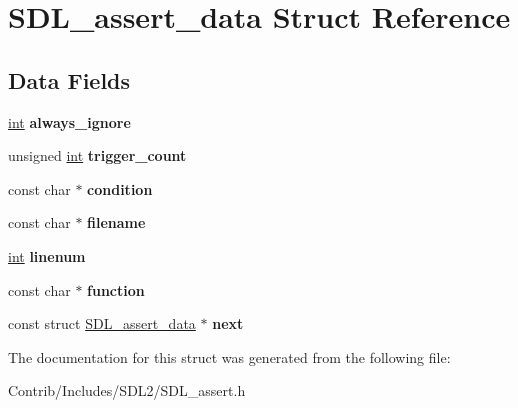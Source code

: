 \hypertarget{struct_s_d_l__assert__data}{}\section{S\+D\+L\+\_\+assert\+\_\+data Struct Reference}
\label{struct_s_d_l__assert__data}
\subsection*{Data Fields}
\begin{DoxyCompactItemize}
\item 
\hyperlink{_s_d_l__thread_8h_a6a64f9be4433e4de6e2f2f548cf3c08e}{int} {\bfseries always\+\_\+ignore}\hypertarget{struct_s_d_l__assert__data_a52448d9ce43ab0e2391bf0d77bd676ba}{}\label{struct_s_d_l__assert__data_a52448d9ce43ab0e2391bf0d77bd676ba}

\item 
unsigned \hyperlink{_s_d_l__thread_8h_a6a64f9be4433e4de6e2f2f548cf3c08e}{int} {\bfseries trigger\+\_\+count}\hypertarget{struct_s_d_l__assert__data_afc560a7b9d6b86f43e495b81f9e68a86}{}\label{struct_s_d_l__assert__data_afc560a7b9d6b86f43e495b81f9e68a86}

\item 
const char $\ast$ {\bfseries condition}\hypertarget{struct_s_d_l__assert__data_a350b75a3ca7336e8c15fbe21494aeaae}{}\label{struct_s_d_l__assert__data_a350b75a3ca7336e8c15fbe21494aeaae}

\item 
const char $\ast$ {\bfseries filename}\hypertarget{struct_s_d_l__assert__data_a7efa5e9c7494c7d4586359300221aa5d}{}\label{struct_s_d_l__assert__data_a7efa5e9c7494c7d4586359300221aa5d}

\item 
\hyperlink{_s_d_l__thread_8h_a6a64f9be4433e4de6e2f2f548cf3c08e}{int} {\bfseries linenum}\hypertarget{struct_s_d_l__assert__data_a696967e9c7408f4d9d8624ad6bd675f3}{}\label{struct_s_d_l__assert__data_a696967e9c7408f4d9d8624ad6bd675f3}

\item 
const char $\ast$ {\bfseries function}\hypertarget{struct_s_d_l__assert__data_afa24a6ca95b4977cec3238001927aa22}{}\label{struct_s_d_l__assert__data_afa24a6ca95b4977cec3238001927aa22}

\item 
const struct \hyperlink{struct_s_d_l__assert__data}{S\+D\+L\+\_\+assert\+\_\+data} $\ast$ {\bfseries next}\hypertarget{struct_s_d_l__assert__data_a3217d34518454947584144e1b311ea5d}{}\label{struct_s_d_l__assert__data_a3217d34518454947584144e1b311ea5d}

\end{DoxyCompactItemize}


The documentation for this struct was generated from the following file\+:\begin{DoxyCompactItemize}
\item 
Contrib/\+Includes/\+S\+D\+L2/S\+D\+L\+\_\+assert.\+h\end{DoxyCompactItemize}
